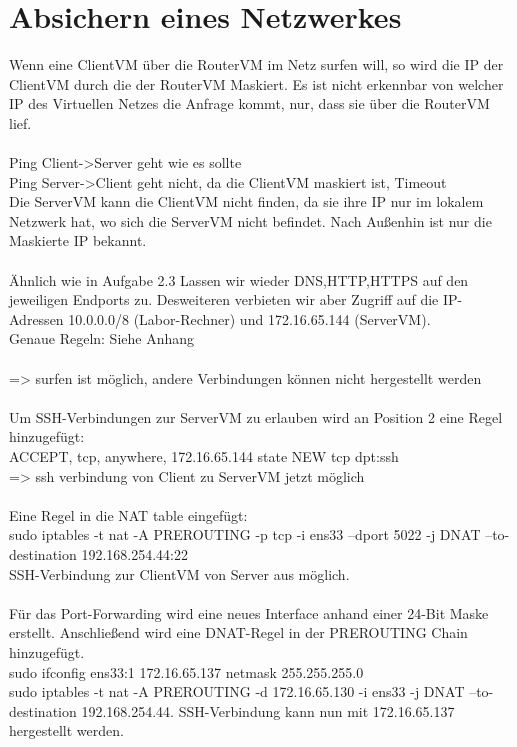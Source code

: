 \documentclass[12pt]{article}
\theoremstyle{plain}
\begin{document}
\section{Absichern eines Netzwerkes}
Wenn eine ClientVM über die RouterVM im Netz surfen will, so wird die IP der ClientVM durch die der RouterVM Maskiert. Es ist nicht erkennbar von welcher IP des Virtuellen Netzes die Anfrage kommt, nur, dass sie über die RouterVM lief.\\\\
Ping Client->Server geht wie es sollte\\
Ping Server->Client geht nicht, da die ClientVM maskiert ist, Timeout\\
Die ServerVM kann die ClientVM nicht finden, da sie ihre IP nur im lokalem Netzwerk hat, wo sich die ServerVM nicht befindet. Nach Außenhin ist nur die Maskierte IP bekannt.\\
\\
Ähnlich wie in Aufgabe 2.3 Lassen wir wieder DNS,HTTP,HTTPS auf den jeweiligen Endports zu. Desweiteren verbieten wir aber Zugriff auf die IP-Adressen 10.0.0.0/8 (Labor-Rechner) und 172.16.65.144 (ServerVM).\\
Genaue Regeln: Siehe Anhang\\\\
=> surfen ist möglich, andere Verbindungen können nicht hergestellt werden\\
\\
Um SSH-Verbindungen zur ServerVM zu erlauben wird an Position 2 eine Regel hinzugefügt:\\
ACCEPT, tcp, anywhere, 172.16.65.144 state NEW tcp dpt:ssh\\
=> ssh verbindung von Client zu ServerVM jetzt möglich\\
\\
Eine Regel in die NAT table eingefügt:\\
sudo iptables -t nat -A PREROUTING -p tcp -i ens33 --dport 5022 -j DNAT --to-destination 192.168.254.44:22\\
SSH-Verbindung zur ClientVM von Server aus möglich.\\
\\
Für das Port-Forwarding wird eine neues Interface anhand einer 24-Bit Maske erstellt. Anschließend wird eine DNAT-Regel in der PREROUTING Chain hinzugefügt.\\
sudo ifconfig ens33:1 172.16.65.137 netmask 255.255.255.0\\
sudo iptables -t nat -A PREROUTING -d 172.16.65.130 -i ens33 -j DNAT --to-destination 192.168.254.44.
SSH-Verbindung kann nun mit 172.16.65.137 hergestellt werden.
\end{document}
